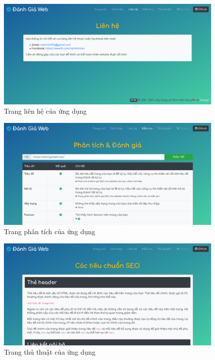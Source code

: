 \begin{center}
    \begin{figure}[!ht]
        \centering
        \includegraphics[width=120mm]{images/trang-lien-he.png}
        \caption{Trang liên hệ của ứng dụng}
    \end{figure}
\end{center}
\begin{center}
    \begin{figure}[!ht]
        \centering
        \includegraphics[width=120mm]{images/trang-phan-tich.png}
        \caption{Trang phân tích của ứng dụng}
    \end{figure}
\end{center}
\begin{center}
    \begin{figure}[!ht]
        \centering
        \includegraphics[width=120mm]{images/trang-thu-thuat.png}
        \caption{Trang thủ thuật của ứng dụng}
    \end{figure}
\end{center}
